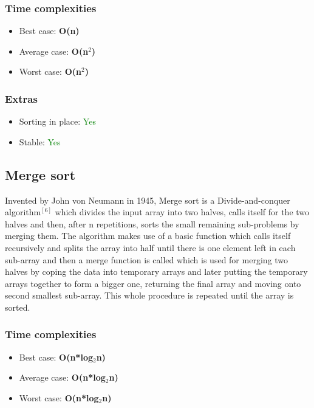 \documentclass{article}
\begin{document}
\begin{multicols}{2}
\subsubsection{Time complexities}
\begin{itemize}
    \item Best case: \textbf{O(n)}
    \item Average case: \textbf{O(n$^2$)}
    \item Worst case: \textbf{O(n$^2$)}
\end{itemize}

\subsubsection{Extras}
\begin{itemize}
    \item Sorting in place: \textcolor{green}{Yes}
    \item Stable: \textcolor{green}{Yes}
\end{itemize}


\bigbreak \bigbreak \bigbreak \bigbreak \bigbreak \bigbreak \bigbreak \bigbreak


\subsection{Merge sort}
Invented by John von Neumann in 1945, Merge sort is a Divide-and-conquer algorithm$^{[6]}$ which divides the input array into two halves, calls itself for the two halves and then, after n repetitions, sorts the small remaining sub-problems by merging them. The algorithm makes use of a basic function which calls itself recursively and splits the array into half until there is one element left in each sub-array and then a merge function is called which is used for merging two halves by coping the data into temporary arrays and later putting the temporary arrays together to form a bigger one, returning the final array and moving onto second smallest sub-array. This whole procedure is repeated until the array is sorted. 

\subsubsection{Time complexities}
\begin{itemize}
    \item Best case: \textbf{O(n*log$_2$n)}
    \item Average case: \textbf{O(n*log$_2$n)}
    \item Worst case: \textbf{O(n*log$_2$n)}
\end{itemize}


\end{multicols}
\end{document}
